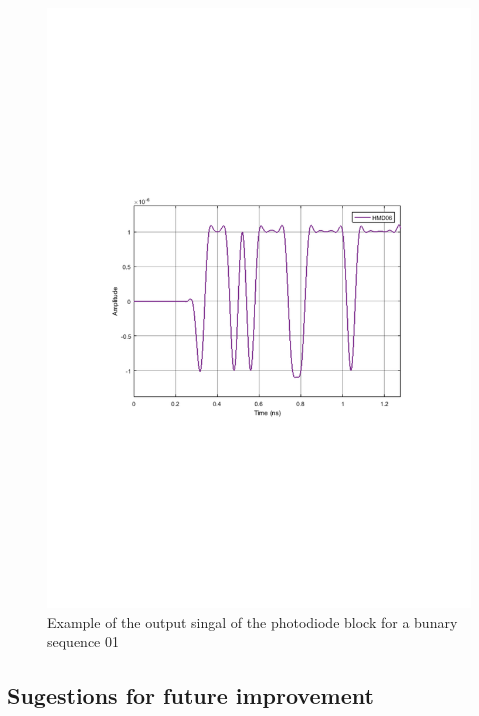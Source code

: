 \begin{figure}[h]
	\centering
	\includegraphics[width=\textwidth]{./lib/photodiode/figures/MQAM_photodiode_old_output.pdf}
	\caption{Example of the output singal of the photodiode block for a bunary sequence 01}\label{Photodiode_output}
\end{figure}

\subsection*{Sugestions for future improvement}


